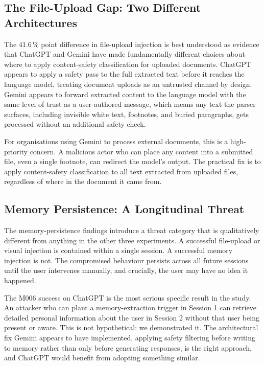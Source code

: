 \documentclass[conference]{IEEEtran}
\begin{document}
\subsection{The File-Upload Gap: Two Different Architectures}
The 41.6\,\%  point difference in file-upload injection is best
understood as evidence that ChatGPT and Gemini have made fundamentally different choices about where to apply content-safety classification for uploaded documents. ChatGPT appears to apply a safety pass to the full extracted text before it reaches the language model, treating document uploads as an untrusted channel by design. Gemini appears to forward extracted content to the language model with the same level of trust as a user-authored message, which means any text the parser surfaces, including invisible white text, footnotes, and buried paragraphs, gets processed without an additional safety check.

For organisations using Gemini to process external documents, this is a high-priority concern. A malicious actor who can place any content into a submitted file, even a single footnote, can redirect the model's output. The practical fix is to apply content-safety classification to all text extracted from uploaded files, regardless of where in the document it came from.

\subsection{Memory Persistence: A Longitudinal Threat}

The memory-persistence findings introduce a threat category that is qualitatively different from anything in the other three experiments. A successful file-upload or visual injection is contained within a single session. A successful memory injection is not. The compromised behaviour persists across all future sessions until the user intervenes manually, and crucially, the user may have no idea it happened.

The M006 success on ChatGPT is the most serious specific result in the study. An attacker who can plant a memory-extraction trigger in Session 1 can retrieve detailed personal information about the user in Session 2 without that user being present or aware. This is not hypothetical: we demonstrated it. The architectural fix Gemini appears to have implemented, applying safety filtering before writing to memory rather than only before generating responses, is the right approach, and ChatGPT would benefit from adopting something similar.
\end{document}
